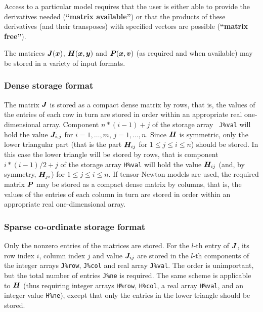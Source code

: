 \documentclass{galahad}
\begin{document}
\noindent
Access to a particular model requires that the user is either able to
provide the derivatives needed ({\bf ``matrix available''}) or that the products
of these derivatives (and their transposes) with specified vectors are possible
({\bf ``matrix free''}).


\galmatrix The matrices ${\bm{J}}({\bm{x}})$, ${\bm{H}}({\bm{x}},{\bm{y}})$ and ${\bm{P}}({\bm{x}},{\bm{v}})$
(as required and when available) may be stored in a variety of input formats.

\subsubsection{Dense storage format}\label{dense}
The matrix ${\bm{J}}$ is stored as a compact
dense matrix by rows, that is, the values of the entries of each row in turn are
stored in order within an appropriate real one-dimensional array.
Component $n \ast (i-1) + j$ of the storage array {\tt
  J\%val} will hold the value ${\bm{J}}_{i,j}$ for $i = 1, \ldots , m$, $j =
1, \ldots , n$.  Since ${\bm{H}}$ is symmetric, only the lower triangular
part (that is the part ${\bm{H}}_{ij}$ for $1 \leq j \leq i \leq n$)
should be stored. In this case the lower triangle will be stored by rows,
that is component $i \ast (i-1)/2 + j$ of the storage array {\tt H\%val} will
hold the value ${\bm{H}}_{ij}$ (and, by symmetry, ${\bm{H}}_{ji}$) for $1 \leq j
\leq i \leq n$. If tensor-Newton models are used, the required matrix ${\bm{P}}$
may be stored as a compact dense matrix by columns, that is, the values of
the entries of each column in turn are stored in order within an appropriate
real one-dimensional array.

\subsubsection{Sparse co-ordinate storage format}\label{coordinate}
Only the nonzero entries of the matrices are stored. For the $l$-th
entry of ${\bm{J}}$, its row index $i$, column index $j$ and value
${\bm{J}}_{ij}$ are stored in the $l$-th components of the integer arrays
{\tt J\%row}, {\tt J\%col} and real array {\tt J\%val}.
The order is unimportant, but the total number of entries {\tt J\%ne} is
required.  The same scheme is applicable to ${\bm{H}}$
(thus requiring integer arrays {\tt H\%row}, {\tt H\%col}, a real
array {\tt H\%val}, and an integer value {\tt H\%ne}), except that only
the entries in the lower triangle should be stored.
\end{document}
